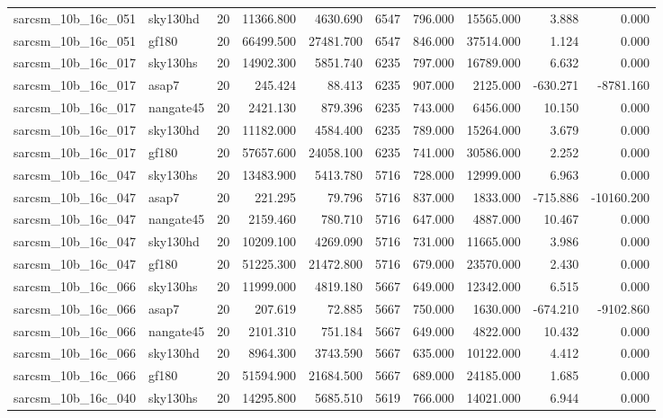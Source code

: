 \begin{longtable}{llrrrrrrrr}
sarcsm\_10b\_16c\_051 & sky130hd & 20 & 11366.800 & 4630.690 & 6547 & 796.000 & 15565.000 & 3.888 & 0.000 \\
sarcsm\_10b\_16c\_051 & gf180 & 20 & 66499.500 & 27481.700 & 6547 & 846.000 & 37514.000 & 1.124 & 0.000 \\
sarcsm\_10b\_16c\_017 & sky130hs & 20 & 14902.300 & 5851.740 & 6235 & 797.000 & 16789.000 & 6.632 & 0.000 \\
sarcsm\_10b\_16c\_017 & asap7 & 20 & 245.424 & 88.413 & 6235 & 907.000 & 2125.000 & -630.271 & -8781.160 \\
sarcsm\_10b\_16c\_017 & nangate45 & 20 & 2421.130 & 879.396 & 6235 & 743.000 & 6456.000 & 10.150 & 0.000 \\
sarcsm\_10b\_16c\_017 & sky130hd & 20 & 11182.000 & 4584.400 & 6235 & 789.000 & 15264.000 & 3.679 & 0.000 \\
sarcsm\_10b\_16c\_017 & gf180 & 20 & 57657.600 & 24058.100 & 6235 & 741.000 & 30586.000 & 2.252 & 0.000 \\
sarcsm\_10b\_16c\_047 & sky130hs & 20 & 13483.900 & 5413.780 & 5716 & 728.000 & 12999.000 & 6.963 & 0.000 \\
sarcsm\_10b\_16c\_047 & asap7 & 20 & 221.295 & 79.796 & 5716 & 837.000 & 1833.000 & -715.886 & -10160.200 \\
sarcsm\_10b\_16c\_047 & nangate45 & 20 & 2159.460 & 780.710 & 5716 & 647.000 & 4887.000 & 10.467 & 0.000 \\
sarcsm\_10b\_16c\_047 & sky130hd & 20 & 10209.100 & 4269.090 & 5716 & 731.000 & 11665.000 & 3.986 & 0.000 \\
sarcsm\_10b\_16c\_047 & gf180 & 20 & 51225.300 & 21472.800 & 5716 & 679.000 & 23570.000 & 2.430 & 0.000 \\
sarcsm\_10b\_16c\_066 & sky130hs & 20 & 11999.000 & 4819.180 & 5667 & 649.000 & 12342.000 & 6.515 & 0.000 \\
sarcsm\_10b\_16c\_066 & asap7 & 20 & 207.619 & 72.885 & 5667 & 750.000 & 1630.000 & -674.210 & -9102.860 \\
sarcsm\_10b\_16c\_066 & nangate45 & 20 & 2101.310 & 751.184 & 5667 & 649.000 & 4822.000 & 10.432 & 0.000 \\
sarcsm\_10b\_16c\_066 & sky130hd & 20 & 8964.300 & 3743.590 & 5667 & 635.000 & 10122.000 & 4.412 & 0.000 \\
sarcsm\_10b\_16c\_066 & gf180 & 20 & 51594.900 & 21684.500 & 5667 & 689.000 & 24185.000 & 1.685 & 0.000 \\
sarcsm\_10b\_16c\_040 & sky130hs & 20 & 14295.800 & 5685.510 & 5619 & 766.000 & 14021.000 & 6.944 & 0.000 \\

\end{longtable}

